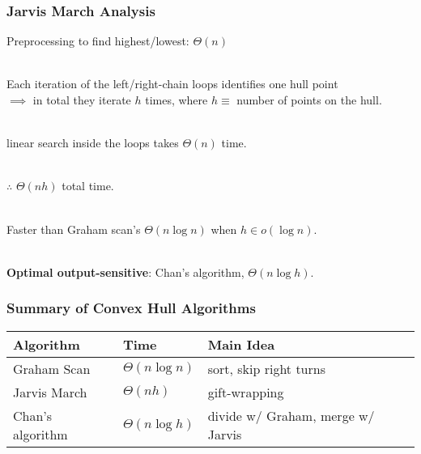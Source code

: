 \documentclass{beamer}
\newcommand{\stanza}{ \\~\ }
\begin{document}
\begin{frame} \frametitle{Jarvis March Analysis}
  Preprocessing to find highest/lowest: $\Theta(n)$ \stanza

  Each iteration of the left/right-chain loops identifies one hull point \\
  $\implies$ in total they iterate $h$ times,
  where $h \equiv $ number of points on the hull. \stanza

  linear search inside the loops takes $\Theta(n)$ time. \stanza

  $\therefore$ $\Theta(nh)$ total time. \stanza

  Faster than Graham scan's $\Theta(n \log n)$ when $h \in o(\log n).$ \stanza

  \textbf{Optimal output-sensitive}: Chan's algorithm, $\Theta(n \log h)$.
\end{frame}

\begin{frame} \frametitle{Summary of Convex Hull Algorithms}
\begin{center}
  \begin{tabular}{|l|l|l|}
    \hline
    \textbf{Algorithm} & \textbf{Time} & \textbf{Main Idea} \\ \hline
    Graham Scan & $\Theta(n \log n)$ & sort, skip right turns \\
    Jarvis March & $\Theta(nh)$ & gift-wrapping \\
    Chan's algorithm & $\Theta(n \log h)$ & divide w/ Graham, merge w/ Jarvis \\
    \hline
  \end{tabular}
\end{center}
\end{frame}
\end{document}
